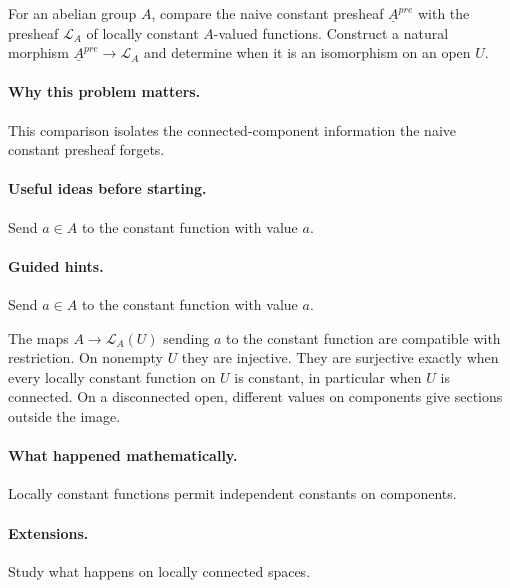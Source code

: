\begin{problem}
For an abelian group $A$, compare the naive constant presheaf $\underline A^{pre}$ with the presheaf $\mathcal L_A$ of locally constant $A$-valued functions.  Construct a natural morphism $\underline A^{pre}\to\mathcal L_A$ and determine when it is an isomorphism on an open $U$.
\end{problem}

\paragraph{Why this problem matters.}
This comparison isolates the connected-component information the naive constant presheaf forgets.

\paragraph{Useful ideas before starting.}
Send $a\in A$ to the constant function with value $a$.

\paragraph{Guided hints.}
Send $a\in A$ to the constant function with value $a$.

\begin{solution}
The maps $A\to\mathcal L_A(U)$ sending $a$ to the constant function are compatible with restriction.  On nonempty $U$ they are injective.  They are surjective exactly when every locally constant function on $U$ is constant, in particular when $U$ is connected.  On a disconnected open, different values on components give sections outside the image.
\end{solution}

\paragraph{What happened mathematically.}
Locally constant functions permit independent constants on components.

\paragraph{Extensions.}
Study what happens on locally connected spaces.
